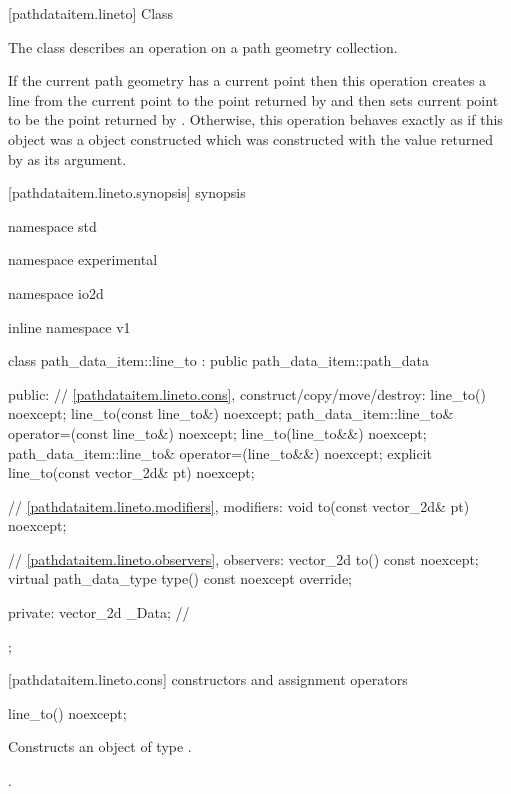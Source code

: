  [pathdataitem.lineto] {Class }

\pnum
{}
The class  describes an operation on a path geometry collection.

\pnum
If the current path geometry has a current point then this operation creates a line from the current point to the point returned by  and then sets current point to be the point returned by . Otherwise, this operation behaves exactly as if this object was a  object constructed which was constructed with the value returned by  as its argument.

 [pathdataitem.lineto.synopsis] { synopsis}

\begin{codeblock}
namespace std { namespace experimental { namespace io2d { inline namespace v1 {
  class path_data_item::line_to : public path_data_item::path_data {
  public:
    // \ref{pathdataitem.lineto.cons}, construct/copy/move/destroy:
    line_to() noexcept;
    line_to(const line_to&) noexcept;
    path_data_item::line_to& operator=(const line_to&) noexcept;
    line_to(line_to&&) noexcept;
    path_data_item::line_to& operator=(line_to&&) noexcept;
    explicit line_to(const vector_2d& pt) noexcept;

    // \ref{pathdataitem.lineto.modifiers}, modifiers:
    void to(const vector_2d& pt) noexcept;

    // \ref{pathdataitem.lineto.observers}, observers:
    vector_2d to() const noexcept;
    virtual path_data_type type() const noexcept override;
    
  private:
    vector_2d _Data; // \expos
  };
} } } }
\end{codeblock}

 [pathdataitem.lineto.cons] { constructors and assignment operators}

\begin{itemdecl}
    line_to() noexcept;
\end{itemdecl}
\begin{itemdescr}
	\pnum
	\effects
	Constructs an object of type .
	
	\pnum
	\postconditions
	.
\end{itemdescr}

